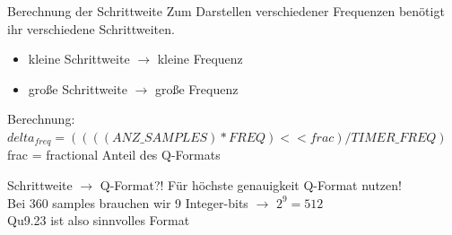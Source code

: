 
\begin{frame} {Berechnung der Schrittweite}
  Zum Darstellen verschiedener Frequenzen benötigt ihr verschiedene Schrittweiten.
  \begin{itemize}
    \item kleine Schrittweite $\rightarrow$ kleine Frequenz
    \item große Schrittweite $\rightarrow$ große Frequenz
  \end{itemize}
  \vspace{0.5cm}
  Berechnung:\\
  $delta_{freq} = ((((ANZ\_SAMPLES) * FREQ) << frac) / TIMER\_FREQ)$\\
  frac = fractional Anteil des Q-Formats
\end{frame}

\begin{frame} {Schrittweite $\rightarrow$ Q-Format?!}
  Für höchste genauigkeit Q-Format nutzen!\\
  \vspace{0.5cm}
  \pause
  Bei 360 samples brauchen wir 9 Integer-bits $\rightarrow$ $2^9 = 512$ \\
  \vspace{0.5cm}
  Qu9.23 ist also sinnvolles Format
\end{frame}


